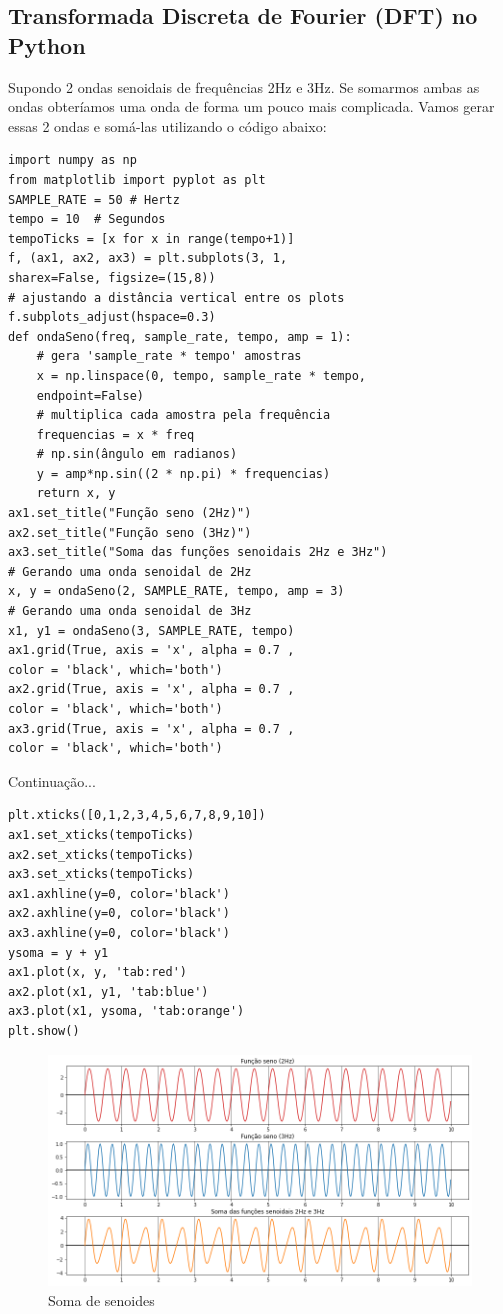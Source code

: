 \subsection {Transformada Discreta de Fourier (DFT) no Python}
Supondo 2 ondas senoidais de frequências 2Hz e 3Hz. Se somarmos ambas as ondas obteríamos uma onda de forma um pouco mais complicada. Vamos gerar essas 2 ondas e somá-las utilizando o código abaixo:

\begin{verbatim}
import numpy as np
from matplotlib import pyplot as plt
SAMPLE_RATE = 50 # Hertz
tempo = 10  # Segundos
tempoTicks = [x for x in range(tempo+1)]
f, (ax1, ax2, ax3) = plt.subplots(3, 1, 
sharex=False, figsize=(15,8))
# ajustando a distância vertical entre os plots
f.subplots_adjust(hspace=0.3)
def ondaSeno(freq, sample_rate, tempo, amp = 1):
	# gera 'sample_rate * tempo' amostras
	x = np.linspace(0, tempo, sample_rate * tempo, 
	endpoint=False)
	# multiplica cada amostra pela frequência
	frequencias = x * freq
	# np.sin(ângulo em radianos)
	y = amp*np.sin((2 * np.pi) * frequencias)
	return x, y
ax1.set_title("Função seno (2Hz)")
ax2.set_title("Função seno (3Hz)")
ax3.set_title("Soma das funções senoidais 2Hz e 3Hz")
# Gerando uma onda senoidal de 2Hz
x, y = ondaSeno(2, SAMPLE_RATE, tempo, amp = 3)
# Gerando uma onda senoidal de 3Hz
x1, y1 = ondaSeno(3, SAMPLE_RATE, tempo)
ax1.grid(True, axis = 'x', alpha = 0.7 , 
color = 'black', which='both')
ax2.grid(True, axis = 'x', alpha = 0.7 , 
color = 'black', which='both')
ax3.grid(True, axis = 'x', alpha = 0.7 , 
color = 'black', which='both')
\end{verbatim}

Continuação...

\begin{verbatim}
plt.xticks([0,1,2,3,4,5,6,7,8,9,10])
ax1.set_xticks(tempoTicks)
ax2.set_xticks(tempoTicks)
ax3.set_xticks(tempoTicks)
ax1.axhline(y=0, color='black')
ax2.axhline(y=0, color='black')
ax3.axhline(y=0, color='black')
ysoma = y + y1
ax1.plot(x, y, 'tab:red')
ax2.plot(x1, y1, 'tab:blue')
ax3.plot(x1, ysoma, 'tab:orange')
plt.show()
\end{verbatim}

\begin{figure}[H]
	\centering
	\includegraphics[width=1\textwidth]{./Imagens/Transformada de Fourier/TF1.png} 
	\caption{Soma de senoides}
	\label{fig:TF1}
\end{figure}

